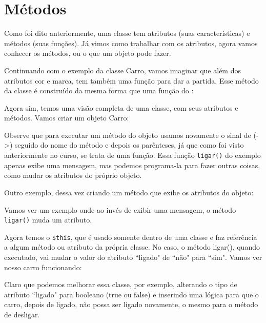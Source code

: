 \section{Métodos}
\label{metodos}

Como foi dito anteriormente, uma classe tem atributos (suas características) e métodos 
(suas funções). Já vimos como trabalhar com os atributos, agora vamos conhecer os métodos, 
ou o que um objeto pode fazer.

Continuando com o exemplo da classe Carro, vamos imaginar que além dos atributos cor e 
marca, tem também uma função para dar a partida. Esse método da classe é construído da 
mesma forma que uma função do \php:



Agora sim, temos uma visão completa de uma classe, com seus atributos e métodos. Vamos 
criar um objeto Carro:



Observe que para executar um método do objeto usamos novamente o sinal de (->) seguido 
do nome do método e depois os parênteses, já que como foi visto anteriormente no curso,
se trata de uma função. Essa função \texttt{ligar()} do exemplo apenas exibe uma mensagem, 
mas podemos programa-la para fazer outras coisas, como mudar os atributos do próprio objeto. 

Outro exemplo, dessa vez criando um método que exibe os atributos do objeto:



Vamos ver um exemplo onde ao invés de exibir uma mensagem, o método \texttt{ligar()} 
muda um atributo.



Agora temos o \texttt{\$this}, que é usado somente dentro de uma classe e faz referência 
a algum método ou atributo da própria classe. No caso, o método ligar(), quando executado, 
vai mudar o valor do atributo ``ligado" de ``não" para ``sim". Vamos ver nosso carro 
funcionando:



Claro que podemos melhorar essa classe, por exemplo, alterando o tipo de atributo 
``ligado" para booleano (true ou false) e inserindo uma lógica para que o carro, depois 
de ligado, não possa ser ligado novamente, o mesmo para o método de desligar.

